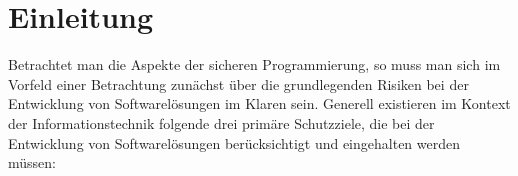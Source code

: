 \section{Einleitung}\label{einleitung}





%
%

Betrachtet man die Aspekte der sicheren Programmierung, so muss man sich im Vorfeld einer Betrachtung zunächst über die grundlegenden  Risiken bei der Entwicklung von Softwarelösungen im Klaren sein. Generell existieren im Kontext der Informationstechnik folgende drei primäre Schutzziele, die bei der Entwicklung von Softwarelösungen berücksichtigt und eingehalten werden müssen:

